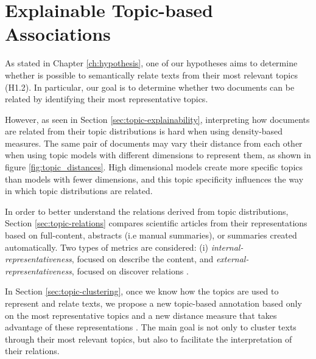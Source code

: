 

\chapter{Explainable Topic-based Associations}\label{ch:explainability}

\graphicspath{{explainability/figures/}}


As stated in Chapter \ref{ch:hypothesis}, one of our hypotheses aims to determine whether is possible to semantically relate texts from their most relevant topics (H1.2). In particular, our goal is to determine whether two documents can be related by identifying their most representative topics.

However, as seen in Section \ref{sec:topic-explainability}, interpreting how documents are related from their topic distributions is hard when using density-based measures. The same pair of documents may vary their distance from each other when using topic models with different dimensions to represent them, as shown in figure \ref{fig:topic_distances}. High dimensional models create more specific topics than models with fewer dimensions, and this topic specificity influences the way in which topic distributions are related. 

In order to better understand the relations derived from topic distributions, Section \ref{sec:topic-relations} compares scientific articles from their representations based on full-content, abstracts (i.e manual summaries), or summaries created automatically. Two types of metrics are considered: (i) \textit{internal-representativeness}, focused on describe the content, and \textit{external-representativeness}, focused on discover relations \citep{Badenes-Olmedo2017c}.    

In Section \ref{sec:topic-clustering}, once we know how the topics are used to represent and relate texts, we propose a new topic-based annotation based only on the most representative topics and a new distance measure that takes advantage of these representations \citep{Badenes-Olmedo2017b}. The main goal is not only to cluster texts through their most relevant topics, but also to facilitate the interpretation of their relations. 


